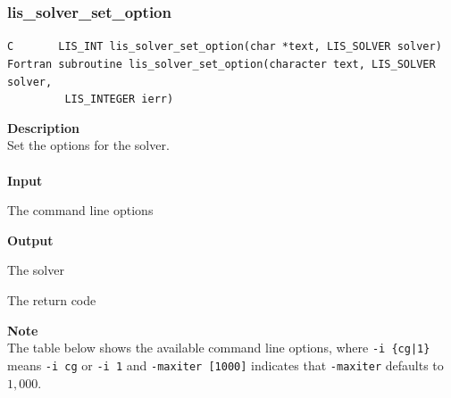 \documentclass[a4paper]{article}
\newcommand{\namelistlabel}[1]{\mbox{#1}\hfill}
\newenvironment{namelist}[1]{%
\begin{list}{}
  {\let\makelabel\namelistlabel
  \settowidth{\labelwidth}{#1}
  \setlength{\leftmargin}{1.1\labelwidth}}
  }{%
\end{list}}
\begin{document}
\newpage
\subsubsection{lis\_solver\_set\_option}
  \label{sec:setoptions}
\begin{screen}
\verb|C       LIS_INT lis_solver_set_option(char *text, LIS_SOLVER solver)|
\verb|Fortran subroutine lis_solver_set_option(character text, LIS_SOLVER solver,|\\
\verb|         LIS_INTEGER ierr)|
\end{screen}
{\bf Description}\\
\indent
Set the options for the solver.
\\ \\
\noindent
{\bf Input}
\begin{namelist}{XXXXXXXXXXXXXXXXXXXX}
\item[\tt text] The command line options
\end{namelist}
{\bf Output}
\begin{namelist}{XXXXXXXXXXXXXXXXXXXX}
\item[\tt solver] The solver
\item[\tt ierr] The return code
\end{namelist}
{\bf Note}\\
\indent
The table below shows the available command line options, 
where \verb=-i {cg|1}= means \verb=-i cg= or \verb=-i 1= and \verb=-maxiter [1000]= indicates 
that \verb=-maxiter= defaults to $1,000$.
\\
\\
\end{document}
